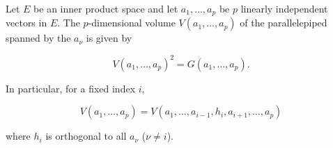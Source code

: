 Let \(E\) be an inner product space and let \(a_1, \ldots, a_p\) be \(p\) linearly independent vectors in \(E\). The \(p\)-dimensional volume \(V(a_1, \ldots, a_p)\) of the parallelepiped spanned by the \(a_{\nu}\) is given by

$$V(a_1, \ldots, a_p)^2 = G(a_1, \ldots, a_p).$$

In particular, for a fixed index \(i\),

$$V(a_1, \ldots, a_p) = V(a_1, \ldots, a_{i-1}, h_i, a_{i+1}, \ldots, a_p)$$

where \(h_i\) is orthogonal to all \(a_{\nu}\) (\(\nu \neq i\)).
